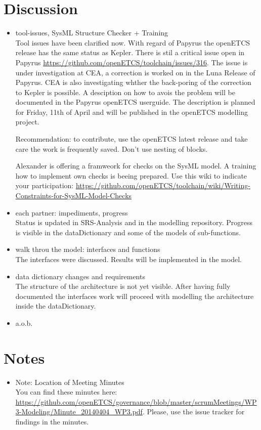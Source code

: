 \documentclass[a4paper, 11pt]{article}
\begin{document}
\section{Discussion}
\begin{itemize}
\item tool-issues, SysML Structure Checker + Training\\
Tool issues have been clarified now. With regard of Papyrus the openETCS release has the same status as Kepler. There is stil a critical issue open in Papyrus \url{https://github.com/openETCS/toolchain/issues/316}. The issue is under investigation at CEA, a correction is worked on in the Luna Release of Papyrus. CEA is also investigating whther the back-poring of the correction to Kepler is possible. A desciption on how to avois the problem will be documented in the Papyrus openETCS userguide. The description is planned for Friday, 11th of April and will be published in the openETCS modelling project.

Recommendation: to contribute, use the openETCS latest release and take care the work is frequently saved. Don't use nesting of blocks.

Alexander is offering a framweork for checks on the SysML model. A training how to implement own checks is beeing prepared. Use this wiki to indicate your participation: \url{https://github.com/openETCS/toolchain/wiki/Writing-Constraints-for-SysML-Model-Checks}

\item each partner: impediments, progress\\
Status is updated in SRS-Analysis and in the modelling repository. Progress is visible in the dataDictionary and some of the models of sub-functions.

\item walk throu the model: interfaces and functions\\
The interfaces were discussed. Results will be implemented in the model.

\item data dictionary changes and requirements\\
The structure of the architecture is not yet visible. After having fully  documented the interfaces  work will proceed with modelling the architecture inside the dataDictionary.

\item a.o.b.


\end{itemize}

\section{Notes}
\begin{itemize}

\item Note: Location of Meeting Minutes\\
You can find these minutes here: \url{https://github.com/openETCS/governance/blob/master/scrumMeetings/WP3-Modeling/Minute_20140404_WP3.pdf}. Please, use the issue tracker for findings in the minutes.

\end{itemize}
\end{document}
